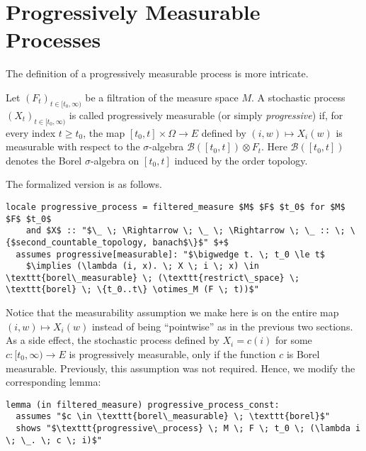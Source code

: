 \section{Progressively Measurable Processes}

The definition of a progressively measurable process is more intricate.

\begin{definition}
	Let $(F_t)_{t \in [t_0, \infty)}$ be a filtration of the measure space $M$. A stochastic process $(X_t)_{t \in [t_0, \infty)}$ is called progressively measurable (or simply \textit{progressive}) if, for every index $t \ge t_0$, the map $[t_0, t] \times \Omega \rightarrow E$ defined by $(i, w) \mapsto X_i(w)$ is measurable with respect to the $\sigma$-algebra $\mathcal{B}([t_0, t]) \otimes F_t$. Here $\mathcal{B}([t_0, t])$ denotes the Borel $\sigma$-algebra on $[t_0, t]$ induced by the order topology.
\end{definition}

The formalized version is as follows.

\begin{isadefinition}
{\small
\begin{lstlisting}[style=isabelle]
locale progressive_process = filtered_measure $M$ $F$ $t_0$ for $M$ $F$ $t_0$
	and $X$ :: "$\_ \; \Rightarrow \; \_ \; \Rightarrow \; \_ :: \; \{$second_countable_topology, banach$\}$" $+$
  assumes progressive[measurable]: "$\bigwedge t. \; t_0 \le t$
	$\implies (\lambda (i, x). \; X \; i \; x) \in \texttt{borel\_measurable} \; (\texttt{restrict\_space} \; \texttt{borel} \; \{t_0..t\} \otimes_M (F \; t))$"
\end{lstlisting}
}
\end{isadefinition}

Notice that the measurability assumption we make here is on the entire map $(i, w) \mapsto X_i(w)$ instead of being ``pointwise'' as in the previous two sections. As a side effect, the stochastic process defined by $X_i = c(i)$ for some $c : [t_0, \infty) \rightarrow E$ is progressively measurable, only if the function $c$ is Borel measurable. Previously, this assumption was not required. Hence, we modify the corresponding lemma:

\begin{isalemma}
{\small
\begin{lstlisting}[style=isabelle]
lemma (in filtered_measure) progressive_process_const:
  assumes "$c \in \texttt{borel\_measurable} \; \texttt{borel}$"
  shows "$\texttt{progressive\_process} \; M \; F \; t_0 \; (\lambda i \; \_. \; c \; i)$"
  \end{lstlisting}
}
\end{isalemma}

